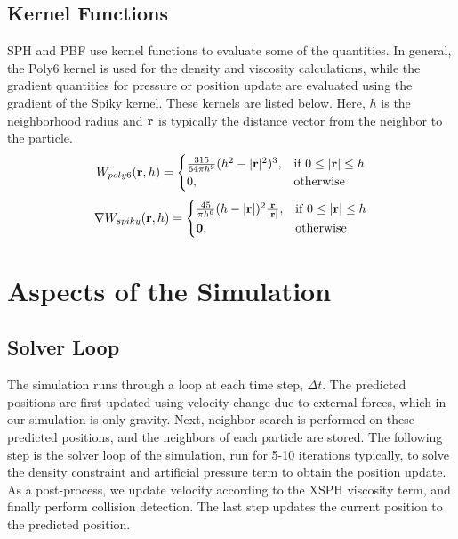 \documentclass[conference]{IEEEtran}
\begin{document}
\subsection*{Kernel Functions}
SPH and PBF use kernel functions to evaluate some of the quantities. In general, the Poly6 kernel is used for the density and viscosity calculations, while the gradient quantities for pressure or position update are evaluated using the gradient of the Spiky kernel. These kernels are listed below. Here, $h$ is the neighborhood radius and $\bold r$ is typically the distance vector from the neighbor to the particle. 
\begin{equation*} 
W_{poly6}(\bold r, h) = \begin{cases}
\frac{315}{64\pi h^9}(h^2-|\bold r|^2)^3, & \text{if } 0 \leq |\bold r| \leq h \\
0, & \text{otherwise}
\end{cases}
\end{equation*}
\begin{equation*} 
\nabla W_{spiky}(\bold r, h) = \begin{cases}
\frac{45}{\pi h^6}(h-|\bold r|)^2 \frac{\bold r}{|\bold r|}, & \text{if } 0 \leq |\bold r| \leq h \\
\bold 0, & \text{otherwise}
\end{cases}
\end{equation*}
\section{Aspects of the Simulation}
\subsection*{Solver Loop} 
The simulation runs through a loop at each time step, $\Delta t$. The predicted positions are first updated using velocity change due to external forces, which in our simulation is only gravity. Next, neighbor search is performed on these predicted positions, and the neighbors of each particle are stored. The following step is the solver loop of the simulation, run for 5-10 iterations typically, to solve the density constraint and artificial pressure term to obtain the position update. As a post-process, we update velocity according to the XSPH viscosity term, and finally perform collision detection. The last step updates the current position to the predicted position. 
\end{document}
